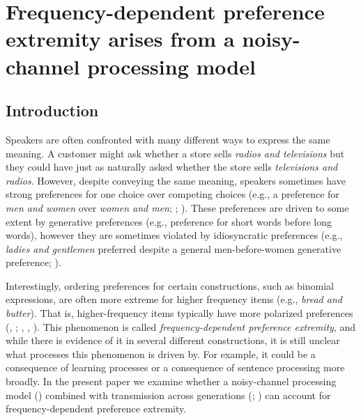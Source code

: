 \documentclass[
  12pt,
  letterpaper,
]{scrreport}
\begin{document}

\chapter{Frequency-dependent preference extremity arises from a
noisy-channel processing
model}\label{frequency-dependent-preference-extremity-arises-from-a-noisy-channel-processing-model}

\section{Introduction}\label{introduction-5}

Speakers are often confronted with many different ways to express the
same meaning. A customer might ask whether a store sells \emph{radios
and televisions} but they could have just as naturally asked whether the
store sells \emph{televisions and radios}. However, despite conveying
the same meaning, speakers sometimes have strong preferences for one
choice over competing choices (e.g., a preference for
\emph{men and women} over \emph{women and men};
;
). These preferences are driven to some extent by generative
preferences (e.g., preference for short words before long words),
however they are sometimes violated by idiosyncratic preferences (e.g.,
\emph{ladies and
gentlemen} preferred despite a general men-before-women generative
preference; ).

Interestingly, ordering preferences for certain constructions, such as
binomial expressions, are often more extreme for higher frequency items
(e.g., \emph{bread and butter}). That is, higher-frequency items
typically have more polarized preferences
(,
;
,
,
).
This phenomenon is called
\emph{frequency-dependent preference extremity}, and while there is
evidence of it in several different constructions, it is still unclear
what processes this phenomenon is driven by. For example, it could be a
consequence of learning processes or a consequence of sentence
processing more broadly. In the present paper we examine whether a
noisy-channel processing model
() combined with transmission across generations
(; ) can account for frequency-dependent preference
extremity.
\end{document}

